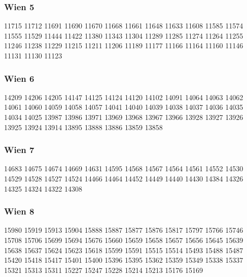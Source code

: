 \subsubsection{Wien 5}
\label{Wien 5}
11715
11712
11691
11690
11670
11668
11661
11648
11633
11608
11585
11574
11555
11529
11444
11422
11380
11343
11304
11289
11285
11274
11264
11255
11246
11238
11229
11215
11211
11206
11189
11177
11166
11164
11160
11146
11131
11130
11123

\subsubsection{Wien 6}
\label{Wien 6}
14209
14206
14205
14147
14125
14124
14120
14102
14091
14064
14063
14062
14061
14060
14059
14058
14057
14041
14040
14039
14038
14037
14036
14035
14034
14025
13987
13986
13971
13969
13968
13967
13966
13928
13927
13926
13925
13924
13914
13895
13888
13886
13859
13858

\subsubsection{Wien 7}
\label{Wien 7}
14683
14675
14674
14669
14631
14595
14568
14567
14564
14561
14552
14530
14529
14528
14527
14524
14466
14464
14452
14449
14440
14430
14384
14326
14325
14324
14322
14308

\subsubsection{Wien 8}
\label{Wien 8}
15980
15919
15913
15904
15888
15887
15877
15876
15817
15797
15766
15746
15708
15706
15699
15694
15676
15660
15659
15658
15657
15656
15645
15639
15638
15637
15624
15623
15618
15599
15591
15515
15514
15493
15488
15487
15420
15418
15417
15401
15400
15396
15395
15362
15359
15349
15338
15337
15321
15313
15311
15227
15247
15228
15214
15213
15176
15169

